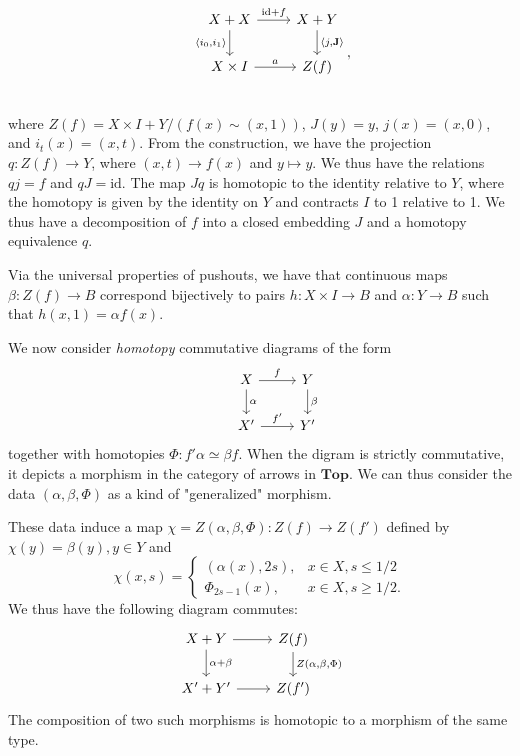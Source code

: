 \documentclass{article}
\theoremstyle{definition}
\newcommand{\cat}[1]{\mathbf{#1}}
\begin{document}
\[
\begin{tikzcd}
&X+X \arrow[r,"\text{id}+f"] \arrow[d,"\langle{i_{0},i_{1}}\rangle"'] &X+Y\arrow[d,"\langle{j,\mathbf{J}}\rangle"]\\
&X\times I\arrow[r,"a"] &Z(f)\\
\end{tikzcd}
,\]
where $Z(f)=X\times I+Y/(f(x)\sim(x,1))$, $J(y)=y$, $j(x)=(x,0)$, and $i_{t}(x)=(x,t).$ From the construction, we have the projection $q:Z(f)\rightarrow Y$, where $(x,t)\rightarrow f(x)$ and $y\mapsto y$. We thus have the relations $qj=f$ and $qJ=\text{id}$. The map $Jq$ is homotopic to the identity relative to $Y$, where the homotopy is given by the identity on $Y$ and contracts $I$ to 1 relative to 1. We thus have a decomposition of $f$ into a closed embedding $J$ and a homotopy equivalence $q$.

Via the universal properties of pushouts, we have that continuous maps $\beta:Z(f)\rightarrow B$ correspond bijectively to pairs $h:X\times I\rightarrow B$ and $\alpha:Y\rightarrow B$ such that $h(x,1)=\alpha f(x).$

We now consider \textit{homotopy} commutative diagrams of the form
\[
\begin{tikzcd}
&X\arrow[r,"f"]\arrow[d,"\alpha"]  &Y\arrow[d,"\beta"]\\
&X'\arrow[r,"f'"] &Y'
\end{tikzcd}
\]
together with homotopies $\Phi:f'\alpha\simeq\beta f.$ When the digram is strictly commutative, it depicts a morphism in the category of arrows in $\cat{Top}$. We can thus consider the data $(\alpha,\beta,\Phi)$ as a kind of "generalized" morphism. 

These data induce a map $\chi=Z(\alpha,\beta,\Phi):Z(f)\rightarrow Z(f')$ defined by $\chi(y)=\beta(y),y\in Y$ and
\[
\chi(x,s)=
\begin{cases}
(\alpha(x),2s), &x\in X,s\leq1/2\\
\Phi_{2s-1}(x), &x\in X,s\geq 1/2.
\end{cases}
\]
We thus have the following diagram commutes:
\[
\begin{tikzcd}
X+Y\arrow[r]\arrow[d,"\alpha+\beta"] &Z(f)\arrow[d,"Z\left({\alpha,\beta,\Phi}\right)"]\\
X'+Y'\arrow[r] &Z(f')
\end{tikzcd}
\]
The composition of two such morphisms is homotopic to a morphism of the same type. 
\end{document}
